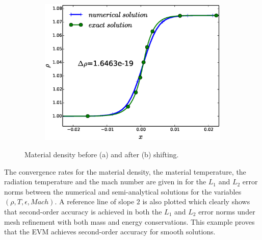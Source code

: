 \documentclass[times,doublespace]{fldauth}%
\begin{document}
\begin{figure}[h]
\begin{subfigure}{0.49\textwidth}
    \includegraphics[width=\linewidth]{figures/cst-xs/mach-1p05/mach-1p05-density-nel-50-plot.eps}
    \caption{}\label{fig:mach-1p05-cst-xs-density-with-shift}
    \end{subfigure}
    \caption{Material density before (a) and after (b) shifting.}\label{fig:mach-1p05-shift-vs-non-shift}
\end{figure}
%
The convergence rates for the material density, the material temperature, the radiation temperature and the mach number are given in  for the $L_1$ and $L_2$ error norms between the numerical and semi-analytical solutions for the variables $(\rho, T, \epsilon, Mach)$. A reference line of slope $2$ is also plotted which clearly shows that second-order accuracy is achieved in both the $L_1$ and $L_2$ error norms under mesh refinement with both mass and energy conservations. This example proves that the EVM achieves second-order accuracy for smooth solutions.
%
\end{document}
